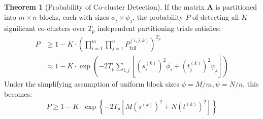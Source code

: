 \documentclass[journal]{IEEEtran}
\theoremstyle{definition}
\newtheorem{theorem}{Theorem}
\theoremstyle{remark} %
\begin{document}
\begin{theorem}[Probability of Co-cluster Detection]
    \label{thm:probability-co-cluster-detection}
    If the matrix $\mathbf{A}$ is partitioned into $m \times n$ blocks, each with sizes $\phi_i \times \psi_j$, the probability $P$ of detecting all $K$ significant co-clusters over $T_p$ independent partitioning trials satisfies:
    \begin{equation}
        \begin{aligned}
            P &\geq 1 - K \cdot \left(\prod_{i=1}^m \prod_{j=1}^n P_\text{fail}^{(i,j,k)}\right)^{T_p} \\
            &\approx 1 - K \cdot \exp\left( -2 T_p \sum_{i,j} \left[ (s_i^{(k)})^2 \phi_i + (t_j^{(k)})^2 \psi_j \right] \right)
        \end{aligned}
    \end{equation}
    Under the simplifying assumption of uniform block sizes $\phi = M/m, \psi=N/n$, this becomes:
    \begin{equation}
        P \geq 1 - K \cdot \exp \left\{ -2 T_p \left[ M (s^{(k)})^2 + N (t^{(k)})^2 \right] \right\}
        \label{eq:prob-of-identifying-all-co-clusters}
    \end{equation}
\end{theorem}
\end{document}
